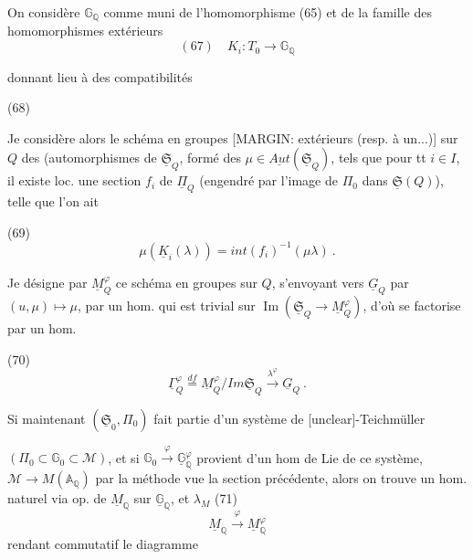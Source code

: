 On considère $\mathbb{G}_{\mathbb{Q}}$ comme muni de l'homomorphisme (65) et de la famille des homomorphismes extérieurs
$$ (67) \quad K_i : T_0 \to \mathbb{G}_{\mathbb{Q}} $$

\newpage


donnant lieu à des compatibilités

(68)

Je considère alors le schéma en groupes [MARGIN: extérieurs (resp. à un...)] sur $Q$ des (automorphismes de $\underline{\mathfrak{S}}_Q$, formé des $\mu \in \underline{Aut}(\underline{\mathfrak{S}}_Q)$, tels que pour tt $i \in I$, il existe loc. une section $f_i$ de $\underline{\Pi}_Q$ (engendré par l'image de $\Pi_0$ dans $\underline{\mathfrak{S}}(Q)$), telle que l'on ait

(69) $$ \mu(\underline{K}_i(\lambda)) = int(f_i)^{-1}(\mu \lambda) \ . $$

Je désigne par $\underline{M}_Q^\varphi$ ce schéma en groupes sur $Q$, s'envoyant vers $\underline{G}_Q$ par $(u,\mu) \mapsto \mu$, par un hom. qui est trivial sur $\operatorname{Im}(\underline{\mathfrak{S}}_Q \to \underline{M}_Q^\varphi)$, d'où se factorise par un hom.

(70) $$ \underline{\Gamma}_Q^\varphi \overset{df}{=} \underline{M}_Q^\varphi / Im \underline{\mathfrak{S}}_Q \xrightarrow{\lambda^\varphi} \underline{G}_Q \ . $$

Si maintenant $(\underline{\mathfrak{S}}_0, \Pi_0)$ fait partie d'un système de [unclear]-Teichmüller

\newpage


$(\Pi_0 \subset \mathbb{G}_0 \subset \mathcal{M})$, et si $\mathbb{G}_0 \xrightarrow{\varphi} \underline{\mathbb{G}}^\varphi_\mathbb{Q}$ provient d'un
hom de Lie de ce système, $\mathcal{M} \to M(\mathbb{A}_\mathbb{Q})$
par la méthode vue la section précédente,
alors on trouve un hom. naturel
via op. de $\underline{M}_\mathbb{Q}$ sur $\underline{\mathbb{G}}_\mathbb{Q}$, et $\lambda_M$
(71) $$ \underline{M}_\mathbb{Q} \xrightarrow{\varphi} \underline{M}^\varphi_\mathbb{Q} $$
rendant commutatif le diagramme

